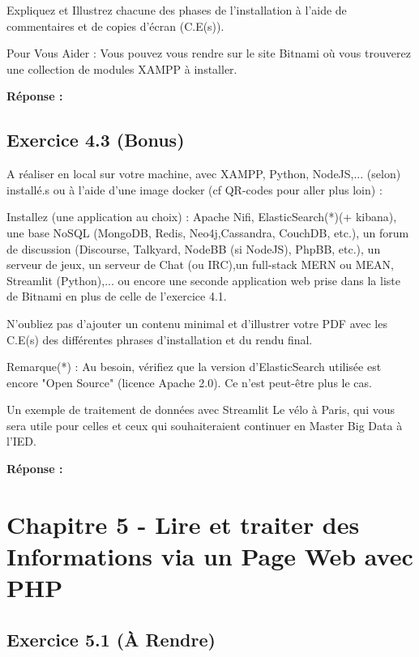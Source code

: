 \documentclass[11pt]{article}
\begin{document}
Expliquez et Illustrez chacune des phases de l’installation à l’aide de commentaires et de copies d’écran (C.E(s)).

Pour Vous Aider : Vous pouvez vous rendre sur le site Bitnami où vous trouverez une collection de modules XAMPP à installer.

\textbf{Réponse :}


	\subsection*{Exercice 4.3 (Bonus)}
	
	A réaliser en local sur votre machine, avec XAMPP, Python, NodeJS,... (selon) installé.s ou à l’aide d’une image docker (cf QR-codes pour aller plus loin) :

Installez (une application au choix) : Apache Nifi, ElasticSearch(*)(+ kibana), une base NoSQL (MongoDB, Redis, Neo4j,Cassandra, CouchDB, etc.), un forum de discussion (Discourse, Talkyard, NodeBB (si NodeJS), PhpBB, etc.), un serveur de
jeux, un serveur de Chat (ou IRC),un full-stack MERN ou MEAN, Streamlit (Python),... ou encore une seconde application web prise dans la liste de Bitnami en plus de celle de l’exercice 4.1.

N’oubliez pas d’ajouter un contenu minimal et d’illustrer votre PDF avec les C.E(s) des différentes phrases d’installation et du rendu final.

Remarque(*) : Au besoin, vérifiez que la version d’ElasticSearch utilisée est encore "Open Source" (licence Apache 2.0). Ce n’est peut-être plus le cas.

Un exemple de traitement de données avec Streamlit Le vélo à Paris, qui vous sera utile pour celles et ceux qui souhaiteraient continuer en Master Big Data à l’IED.

\textbf{Réponse :}

\section*{Chapitre 5 - Lire et traiter des Informations via un Page Web avec PHP}

	\subsection*{Exercice 5.1 (À Rendre)}
\end{document}
